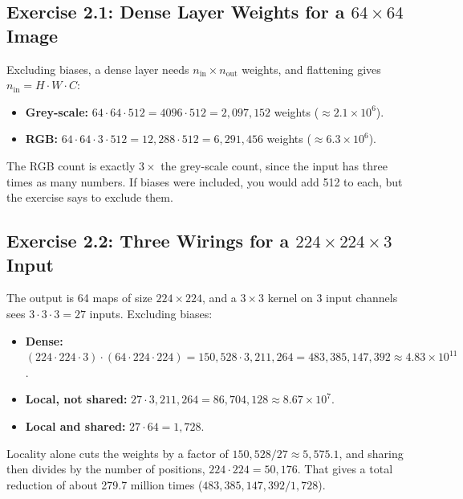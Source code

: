 \subsection*{Exercise 2.1: Dense Layer Weights for a $64\times64$ Image}

Excluding biases, a dense layer needs $n_{\text{in}} \times n_{\text{out}}$ weights, and flattening gives $n_{\text{in}} = H \cdot W \cdot C$:

\begin{itemize}[leftmargin=*]
  \item \textbf{Grey-scale:} $64 \cdot 64 \cdot 512 = 4096 \cdot 512 = 2{,}097{,}152$ weights ($\approx 2.1\times10^{6}$).
  \item \textbf{RGB:} $64 \cdot 64 \cdot 3 \cdot 512 = 12{,}288 \cdot 512 = 6{,}291{,}456$ weights ($\approx 6.3\times10^{6}$).
\end{itemize}

The RGB count is exactly $3\times$ the grey-scale count, since the input has three times as many numbers. If biases were included, you would add 512 to each, but the exercise says to exclude them.

\subsection*{Exercise 2.2: Three Wirings for a $224\times224\times3$ Input}

The output is 64 maps of size $224\times224$, and a $3\times3$ kernel on 3 input channels sees $3\cdot3\cdot3 = 27$ inputs. Excluding biases:

\begin{itemize}[leftmargin=*]
  \item \textbf{Dense:} $(224\cdot224\cdot3)\cdot(64\cdot224\cdot224) = 150{,}528 \cdot 3{,}211{,}264 = 483{,}385{,}147{,}392 \approx 4.83\times10^{11}$.
  \item \textbf{Local, not shared:} $27 \cdot 3{,}211{,}264 = 86{,}704{,}128 \approx 8.67\times10^{7}$.
  \item \textbf{Local and shared:} $27 \cdot 64 = 1{,}728$.
\end{itemize}

Locality alone cuts the weights by a factor of $150{,}528 / 27 \approx 5{,}575.1$, and sharing then divides by the number of positions, $224\cdot224 = 50{,}176$. That gives a total reduction of about 279.7 million times ($483{,}385{,}147{,}392 / 1{,}728$).

